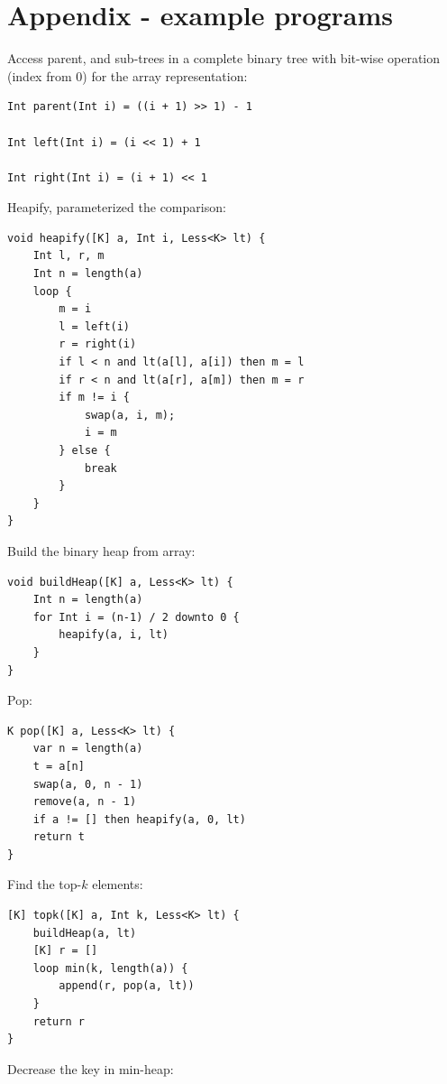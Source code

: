 \documentclass[b5paper]{article}
\begin{document}
\section{Appendix - example programs}

Access parent, and sub-trees in a complete binary tree with bit-wise operation (index from 0) for the array representation:

\begin{lstlisting}[language = Bourbaki]
Int parent(Int i) = ((i + 1) >> 1) - 1

Int left(Int i) = (i << 1) + 1

Int right(Int i) = (i + 1) << 1
\end{lstlisting}

Heapify, parameterized the comparison:

\begin{lstlisting}[language = Bourbaki]
void heapify([K] a, Int i, Less<K> lt) {
    Int l, r, m
    Int n = length(a)
    loop {
        m = i
        l = left(i)
        r = right(i)
        if l < n and lt(a[l], a[i]) then m = l
        if r < n and lt(a[r], a[m]) then m = r
        if m != i {
            swap(a, i, m);
            i = m
        } else {
            break
        }
    }
}
\end{lstlisting}

Build the binary heap from array:

\begin{lstlisting}[language = Bourbaki]
void buildHeap([K] a, Less<K> lt) {
    Int n = length(a)
    for Int i = (n-1) / 2 downto 0 {
        heapify(a, i, lt)
    }
}
\end{lstlisting}

Pop:

\begin{lstlisting}[language = Bourbaki]
K pop([K] a, Less<K> lt) {
    var n = length(a)
    t = a[n]
    swap(a, 0, n - 1)
    remove(a, n - 1)
    if a != [] then heapify(a, 0, lt)
    return t
}
\end{lstlisting}

Find the top-$k$ elements:

\begin{lstlisting}[language = Bourbaki]
[K] topk([K] a, Int k, Less<K> lt) {
    buildHeap(a, lt)
    [K] r = []
    loop min(k, length(a)) {
        append(r, pop(a, lt))
    }
    return r
}
\end{lstlisting}

Decrease the key in min-heap:
\end{document}
